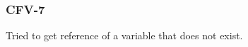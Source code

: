 \subsubsection{CFV-7}\label{sec:error_code_cfv_7}

Tried to get reference of a variable that does not exist.



